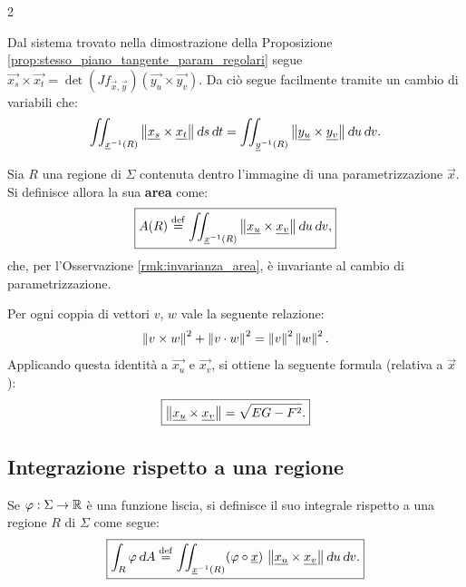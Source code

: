 \begin{multicols*}{2}
    \begin{remark} \label{rmk:invarianza_area}
        Dal sistema trovato nella dimostrazione della Proposizione \ref{prop:stesso_piano_tangente_param_regolari}
        segue $\vec{x_s} \times \vec{x_t} = \det(J f_{\vec{x}, \vec{y}}) (\vec{y_u} \times \vec{y_v})$.
        Da ciò segue facilmente tramite un cambio di variabili che:
        \[
            \iint_{\vec{x}\inv(R)} \norm{\vec{x_s} \times \vec{x_t}} \ds \dt = \iint_{\vec{y}\inv(R)} \norm{\vec{y_u} \times \vec{y_v}} \du \dv.
        \]
    \end{remark}

    \begin{definition}
        Sia $R$ una regione di $\Sigma$ contenuta dentro l'immagine
        di una parametrizzazione $\vec{x}$. Si definisce allora la sua \textbf{area}
        come:
        \[
            \boxed{A(R) \defeq \iint_{\vec{x}\inv(R)} \norm{\vec{x_u} \times \vec{x_v}} \du \dv,}
        \]
        che, per l'Osservazione \ref{rmk:invarianza_area}, è invariante al cambio
        di parametrizzazione.
    \end{definition}

    \begin{proposition}
        Per ogni coppia di vettori $v$, $w$ vale la seguente relazione:
        \[
            \left\lVert v \times w \right\rVert^2 + \left\lVert v \cdot w \right\rVert^2 = \left\lVert v \right\rVert^2 \left\lVert w \right\rVert^2.
        \]
        Applicando questa identità a $\vec{x_u}$ e $\vec{x_v}$, si ottiene
        la seguente formula (relativa a $\vec{x}$):
        \[
            \boxed{\left\lVert {\underline{x_u}} \times {\underline{x_v}} \right\rVert = \sqrt{EG - F^2}.}
        \]
    \end{proposition}

    \subsection{Integrazione rispetto a una regione}

    \begin{definition}
        Se $\varphi : \Sigma \to \mathbb{R}$ è una funzione liscia, si
        definisce il suo integrale rispetto a una regione $R$ di $\Sigma$
        come segue:
        \[
            \boxed{\int_R \varphi \dA \defeq \iint_{\vec{x}\inv(R)} (\varphi \circ \vec{x}) \, \norm{\vec{x_u} \times \vec{x_v}} \du \dv.}
        \]
    \end{definition}


\end{multicols*}
